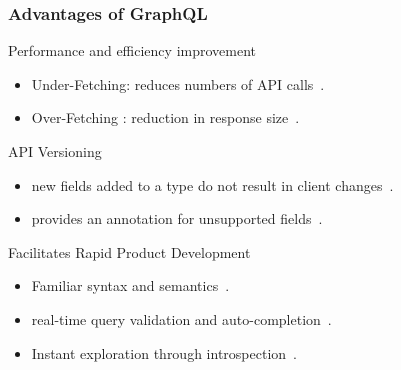 \begin{frame}\frametitle{Advantages of GraphQL}


\begin{block}{Performance and efficiency improvement}
\begin{itemize}
  \item Under-Fetching: reduces  numbers of API calls~\cite{migrating-to-gql}.
  \item Over-Fetching : reduction in response size~\cite{migrating-to-gql}.
\end{itemize}
\end{block}

\begin{block}{API Versioning}
\begin{itemize}
  \item new fields added to a type do not result in client changes~\cite{migrating-to-gql}. 
  \item provides an  annotation for unsupported fields~\cite{migrating-to-gql}. 
\end{itemize}

\end{block}

\begin{block}{Facilitates Rapid Product Development}
\begin{itemize}
  \item  Familiar syntax and semantics~\cite{rest-vs-gql-controlled-experiment}.
  \item real-time query validation and auto-completion~\cite{rest-vs-gql-controlled-experiment,migrating-to-gql}.
  \item Instant exploration through introspection~\cite{migrating-to-gql}. 
\end{itemize}

\end{block}

\end{frame}

